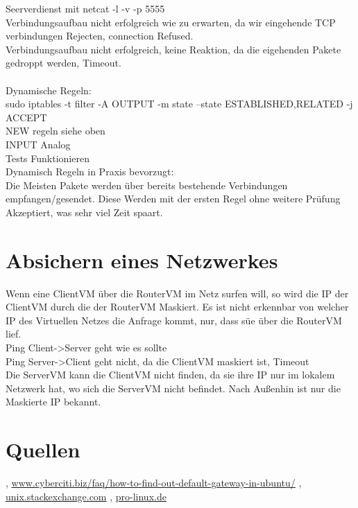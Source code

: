 \documentclass[12pt]{article}
\theoremstyle{plain}
\begin{document}
Seerverdienst mit netcat -l -v -p 5555\\
Verbindungsaufbau nicht erfolgreich wie zu erwarten, da wir eingehende TCP verbindungen Rejecten, connection Refused.\\
Verbindungsaufbau nicht erfolgreich, keine Reaktion, da die eigehenden Pakete gedroppt werden, Timeout.\\
\\
Dynamische Regeln:\\
sudo iptables -t filter -A OUTPUT -m state --state ESTABLISHED,RELATED -j ACCEPT\\
NEW regeln siehe oben\\
INPUT Analog\\
Tests Funktionieren\\
Dynamisch  Regeln in Praxis bevorzugt:\\
Die Meisten Pakete werden über bereits bestehende Verbindungen empfangen/gesendet. Diese Werden mit der ersten Regel ohne weitere Prüfung Akzeptiert, was sehr viel Zeit spaart.
\section{Absichern eines Netzwerkes}
Wenn eine ClientVM über die RouterVM im Netz surfen will, so wird die IP der ClientVM durch die der RouterVM Maskiert. Es ist nicht erkennbar von welcher IP des Virtuellen Netzes die Anfrage kommt, nur, dass süe über die RouterVM lief.\\
Ping Client->Server geht wie es sollte\\
Ping Server->Client geht nicht, da die ClientVM maskiert ist, Timeout\\
Die ServerVM kann die ClientVM nicht finden, da sie ihre IP nur im lokalem Netzwerk hat, wo sich die ServerVM nicht befindet. Nach Außenhin ist nur die Maskierte IP bekannt.
\section{Quellen}
\begin{thebibliography}{50}
\bibitem  [Cyberciti], \url{www.cyberciti.biz/faq/how-to-find-out-default-gateway-in-ubuntu/}
\bibitem [Stackexchange] , \url{unix.stackexchange.com}
, \url{pro-linux.de}
\end{thebibliography}
\end{document}
